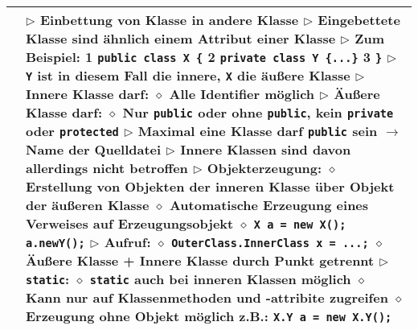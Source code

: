 \begin{longtable}{ | p{} p{} | }
	\makecell[l]{Verschachtelte Klassen} & \makecell[l]{
	$\rhd$ Einbettung von Klasse in andere Klasse \\
	$\rhd$ Eingebettete Klasse sind ähnlich einem Attribut einer Klasse \\
	$\rhd$ Zum Beispiel:
	\hspace{0.4cm} 1 \hspace{0.1cm} \texttt{public class X \{} \\
	\hspace{0.4cm} 2 \hspace{0.5cm} \texttt{private class Y \{...\}} \\
	\hspace{0.4cm} 3 \hspace{0.1cm} \texttt{\}} \\
	$\rhd$ \texttt{Y} ist in diesem Fall die innere, \texttt{X} die äußere Klasse \\
	$\rhd$ Innere Klasse darf: \\
	\hspace{0.4cm} $\diamond$ Alle Identifier möglich \\
	$\rhd$ Äußere Klasse darf: \\
	\hspace{0.4cm} $\diamond$ Nur \texttt{public} oder ohne \texttt{public}, kein \texttt{private} oder \texttt{protected} \\
	$\rhd$ Maximal eine Klasse darf \texttt{public} sein $\rightarrow$ Name der Quelldatei \\
	$\rhd$ Innere Klassen sind davon allerdings nicht betroffen \\
	$\rhd$ Objekterzeugung: \\
	\hspace{0.4cm} $\diamond$ Erstellung von Objekten der inneren Klasse über Objekt der äußeren Klasse \\ 
	\hspace{0.4cm} $\diamond$ Automatische Erzeugung eines Verweises auf Erzeugungsobjekt \\
	\hspace{0.4cm} $\diamond$ \texttt{X a = new X(); a.newY();} \\
	$\rhd$  Aufruf: \\
	\hspace{0.4cm} $\diamond$ \texttt{OuterClass.InnerClass x = ...;} \\
	\hspace{0.4cm} $\diamond$ Äußere Klasse + Innere Klasse durch Punkt getrennt \\
	$\rhd$ \texttt{static}: \\
	\hspace{0.4cm} $\diamond$ \texttt{static} auch bei inneren Klassen möglich \\
	\hspace{0.4cm} $\diamond$ Kann nur auf Klassenmethoden und -attribite zugreifen \\
	\hspace{0.4cm} $\diamond$ Erzeugung ohne Objekt möglich z.B.: \texttt{X.Y a = new X.Y();} } \\ \hline
	
	\end{longtable}

